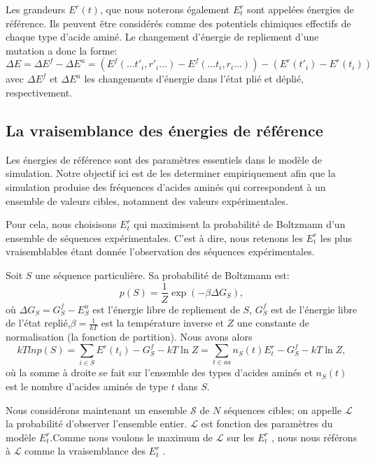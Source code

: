 Les grandeurs $E^r(t)$, que nous noterons également $E_t^r$ sont appelées \og énergies de référence\fg. Ils peuvent être considérés comme des potentiels chimiques effectifs de chaque type d'acide aminé. Le changement d'énergie de repliement d'une mutation a donc la forme:
\begin{equation} \label{eq:deltaE}
  \Delta E=\Delta E^f - \Delta E^u=(E^f(...t'_i,r'_i...) - E^f(...t_i,r_i...)) -(E^r(t'_i) - E^r(t_i))
\end{equation} 
avec $\Delta E^f$ et  $\Delta E^u$ les changements d'énergie dans l'état plié et déplié, respectivement.

\subsection{La vraisemblance des énergies de référence}
Les énergies de référence sont des paramètres essentiels dans le modèle de simulation. Notre objectif ici
est de les determiner empiriquement afin que la simulation produise des fréquences d'acides aminés
qui correspondent à un ensemble de valeurs cibles, notamnent des valeurs expérimentales.

Pour cela, nous choisisons $E_t^r$ qui maximisent la probabilité de Boltzmann d'un ensemble de séquences expérimentales.
C'est à dire, nous retenons les $E_t^r$ les plus vraisemblables étant donnée l'observation des séquences expérimentales.

Soit $S$ une séquence particulière. Sa probabilité de Boltzmann est:
\begin{equation}
  p(S)=\frac{1}{Z}\exp(-\beta \Delta G_S),
\end{equation}
où $\Delta G_S=G_S^f - E^u_S $ est l'énergie libre de repliement de $S$, $G^f_S$ est de l'énergie libre de l'état replié,$\beta =\frac{1}{kT}$ est la température inverse et $Z$ une constante de normalisation (la fonction de partition). Nous avons alors
\begin{equation}
kTln p(S) = \sum_{i\in S} E^r(t_i) - G^f_S - kT \ln Z = \sum_{t\in aa}n_S(t)E^r_t - G^f_S - kT\ln Z,
\end{equation}
où la somme à droite se fait sur l'ensemble des types d'acides aminés et $n_S(t)$ est le nombre d'acides aminés de type $t$ dans $S$.

Nous considérons maintenant un ensemble $\mathcal{S}$ de $N$ séquences cibles; on appelle $\mathcal{L}$ la probabilité d'observer l'ensemble entier. $\mathcal{L}$ est fonction des paramètres du modèle $E_t^r$.Comme nous voulons le maximum de $\mathcal{L}$ sur les $E_t^r$ , nous nous référons  à  $\mathcal{L}$ comme la vraisemblance des $E_t^r$ \cite{Kleinman06}.

